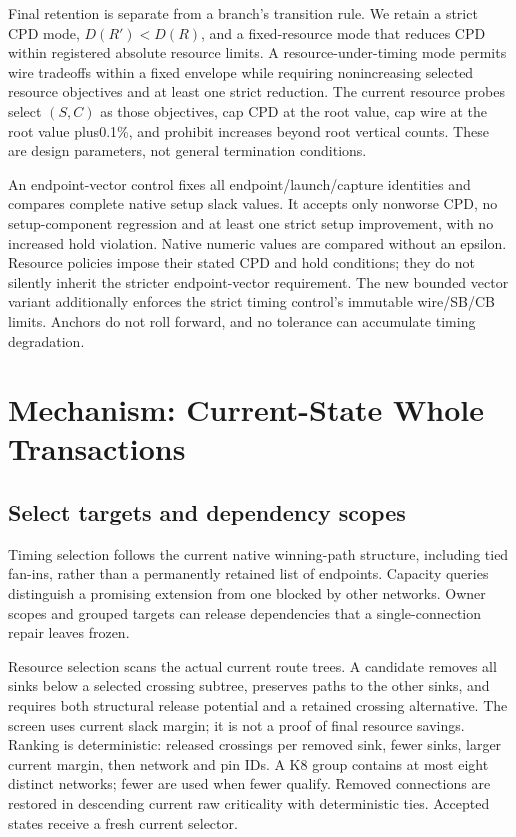 \documentclass[conference,10pt]{IEEEtran}
\begin{document}
Final retention is separate from a branch's transition rule. We retain a strict CPD mode, $D(R')<D(R)$, and a fixed-resource mode that reduces CPD within registered absolute resource limits. A resource-under-timing mode permits wire tradeoffs within a fixed envelope while requiring nonincreasing selected resource objectives and at least one strict reduction. The current resource probes select $(S,C)$ as those objectives, cap CPD at the root value, cap wire at the root value plus0.1\%, and prohibit increases beyond root vertical counts. These are design parameters, not general termination conditions.

An endpoint-vector control fixes all endpoint/launch/capture identities and compares complete native setup slack values. It accepts only nonworse CPD, no setup-component regression and at least one strict setup improvement, with no increased hold violation. Native numeric values are compared without an epsilon. Resource policies impose their stated CPD and hold conditions; they do not silently inherit the stricter endpoint-vector requirement. The new bounded vector variant additionally enforces the strict timing control's immutable wire/SB/CB limits. Anchors do not roll forward, and no tolerance can accumulate timing degradation.

\section{Mechanism: Current-State Whole Transactions}
\subsection{Select targets and dependency scopes}
Timing selection follows the current native winning-path structure, including tied fan-ins, rather than a permanently retained list of endpoints. Capacity queries distinguish a promising extension from one blocked by other networks. Owner scopes and grouped targets can release dependencies that a single-connection repair leaves frozen.

Resource selection scans the actual current route trees. A candidate removes all sinks below a selected crossing subtree, preserves paths to the other sinks, and requires both structural release potential and a retained crossing alternative. The screen uses current slack margin; it is not a proof of final resource savings. Ranking is deterministic: released crossings per removed sink, fewer sinks, larger current margin, then network and pin IDs. A K8 group contains at most eight distinct networks; fewer are used when fewer qualify. Removed connections are restored in descending current raw criticality with deterministic ties. Accepted states receive a fresh current selector.
\end{document}
